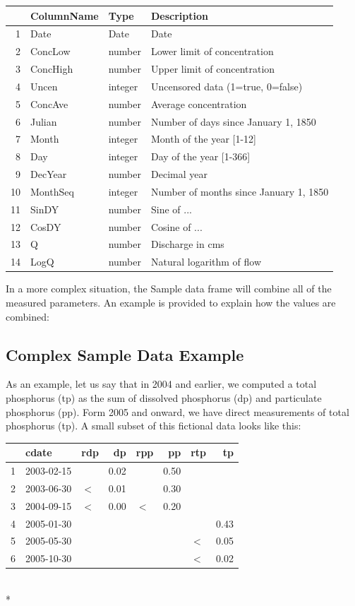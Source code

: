 \documentclass[a4paper,11pt]{article}
\begin{document}
\begin{tabular}{rlll}
  \hline
 & ColumnName & Type & Description \\ 
  \hline
1 & Date & Date & Date \\ 
  2 & ConcLow & number & Lower limit of concentration \\ 
  3 & ConcHigh & number & Upper limit of concentration \\ 
  4 & Uncen & integer & Uncensored data (1=true, 0=false) \\ 
  5 & ConcAve & number & Average concentration \\ 
  6 & Julian & number & Number of days since January 1, 1850 \\ 
  7 & Month & integer & Month of the year [1-12] \\ 
  8 & Day & integer & Day of the year [1-366] \\ 
  9 & DecYear & number & Decimal year \\ 
  10 & MonthSeq & integer & Number of months since January 1, 1850 \\ 
  11 & SinDY & number & Sine of ... \\ 
  12 & CosDY & number & Cosine of ... \\ 
  13 & Q & number & Discharge in cms \\ 
  14 & LogQ & number & Natural logarithm of flow \\ 
   \hline
\end{tabular}
In a more complex situation, the Sample data frame will combine all of the measured parameters.  An example is provided to explain how the values are combined:

\subsection{Complex Sample Data Example}
As an example, let us say that in 2004 and earlier, we computed a total phosphorus (tp) as the sum of dissolved phosphorus (dp) and particulate phosphorus (pp). Form 2005 and onward, we have direct measurements of total phosphorus (tp). A small subset of this fictional data looks like this:

\begin{tabular}{rllrlrlr}
  \hline
 & cdate & rdp & dp & rpp & pp & rtp & tp \\ 
  \hline
1 & 2003-02-15 &  & 0.02 &  & 0.50 &  &  \\ 
  2 & 2003-06-30 & $<$ & 0.01 &  & 0.30 &  &  \\ 
  3 & 2004-09-15 & $<$ & 0.00 & $<$ & 0.20 &  &  \\ 
  4 & 2005-01-30 &  &  &  &  &  & 0.43 \\ 
  5 & 2005-05-30 &  &  &  &  & $<$ & 0.05 \\ 
  6 & 2005-10-30 &  &  &  &  & $<$ & 0.02 \\ 
   \hline
\end{tabular}\\*
\end{document}

